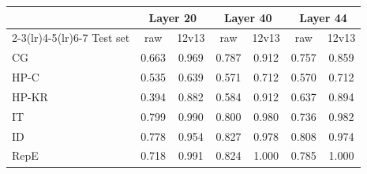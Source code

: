 \begin{tabular}{lcccccc}
\toprule
 & \multicolumn{2}{c}{Layer 20} & \multicolumn{2}{c}{Layer 40} & \multicolumn{2}{c}{Layer 44} \\
\cmidrule(lr){2-3}\cmidrule(lr){4-5}\cmidrule(lr){6-7}
Test set & raw & 12v13 & raw & 12v13 & raw & 12v13 \\
\midrule
CG & 0.663 & 0.969 & 0.787 & 0.912 & 0.757 & 0.859 \\
HP-C & 0.535 & 0.639 & 0.571 & 0.712 & 0.570 & 0.712 \\
HP-KR & 0.394 & 0.882 & 0.584 & 0.912 & 0.637 & 0.894 \\
IT & 0.799 & 0.990 & 0.800 & 0.980 & 0.736 & 0.982 \\
ID & 0.778 & 0.954 & 0.827 & 0.978 & 0.808 & 0.974 \\
RepE & 0.718 & 0.991 & 0.824 & 1.000 & 0.785 & 1.000 \\
\bottomrule
\end{tabular}
